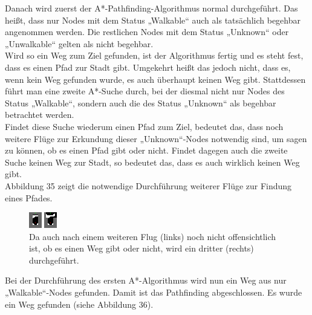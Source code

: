 \documentclass[a4paper,12pt]{article}
\begin{document}
Danach wird zuerst der A*-Pathfinding-Algorithmus normal durchgeführt. Das heißt, dass nur Nodes mit dem Status „Walkable“ auch als tatsächlich begehbar angenommen werden. Die restlichen Nodes mit dem Status „Unknown“ oder „Unwalkable“ gelten als nicht begehbar.
\\[0.4cm]
Wird so ein Weg zum Ziel gefunden, ist der Algorithmus fertig und es steht fest, dass es einen Pfad zur Stadt gibt. Umgekehrt heißt das jedoch nicht, dass es, wenn kein Weg gefunden wurde, es auch überhaupt keinen Weg gibt. Stattdessen führt man eine zweite A*-Suche durch, bei der diesmal nicht nur Nodes des Status „Walkable“, sondern auch die des Status „Unknown“ als begehbar betrachtet werden.
\\[0.4cm]
Findet diese Suche wiederum einen Pfad zum Ziel, bedeutet das, dass noch weitere Flüge zur Erkundung dieser „Unknown“-Nodes notwendig sind, um sagen zu können, ob es einen Pfad gibt oder nicht.
Findet dagegen auch die zweite Suche keinen Weg zur Stadt, so bedeutet das, dass es auch wirklich keinen Weg gibt.
\\[0.4cm]
Abbildung 35 zeigt die notwendige Durchführung weiterer Flüge zur Findung eines Pfades.
\begin{figure}[H]
\centering
    \includegraphics[width=1\linewidth]{Bilder/Aufgabe3/Beispiel_03.png}
    \caption{Da auch nach einem weiteren Flug (links) noch nicht offensichtlich ist, ob es einen Weg gibt oder nicht, wird ein dritter (rechts) durchgeführt.}
\end{figure}
Bei der Durchführung des ersten A*-Algorithmus wird nun ein Weg aus nur „Walkable“-Nodes gefunden. Damit ist das Pathfinding abgeschlossen. Es wurde ein Weg gefunden (siehe Abbildung 36).
\end{document}
